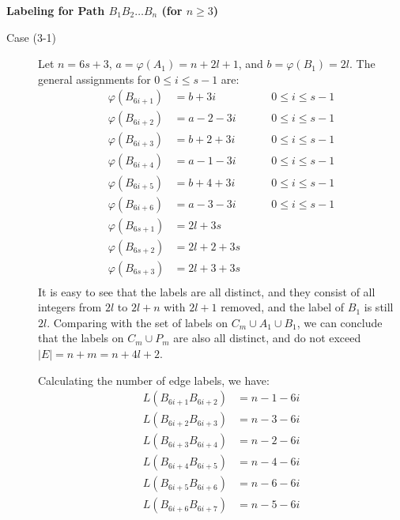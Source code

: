 \documentclass[fleqn,svgnames,screen,acmsmall]{ml2rcn}
\begin{document}
\textbf{Labeling for Path \(B_{1}B_{2} \ldots B_{n}\) (for \(n \ge 3\))}

\begin{description}
  
\item[Case (3-1)] Let \(n=6s+3\),  \(a = \varphi(A_{1}) = n+2l+1\), and \(b = \varphi(B_{1}) = 2l\). The general assignments for \(0 \le i \le s-1\) are:
\begin{equation}
\label{eq:case31}
  \begin{aligned}
  \varphi(B_{6i+1}) &= b+3i   & \quad \quad 0 \leq i \leq s-1\\
  \varphi(B_{6i+2}) &= a-2-3i & \quad \quad 0 \leq i \leq s-1\\
  \varphi(B_{6i+3}) &= b+2+3i & \quad \quad 0 \leq i \leq s-1\\
  \varphi(B_{6i+4}) &= a-1-3i & \quad \quad 0 \leq i \leq s-1\\
  \varphi(B_{6i+5}) &= b+4+3i & \quad \quad 0 \leq i \leq s-1\\
  \varphi(B_{6i+6}) &= a-3-3i & \quad \quad 0 \leq i \leq s-1\\
  \varphi(B_{6s+1}) &= 2l+3s \\
  \varphi(B_{6s+2}) &= 2l+2+3s \\
  \varphi(B_{6s+3}) &= 2l+3+3s \\
  \end{aligned}
\end{equation}
It is easy to see that the labels are all distinct, and they consist of all integers from $2l$ to $2l+n$ with 
$2l+1$ removed, and the label of $B_1$ is still $2l$. Comparing with the set of labels on $C_m \cup A_1 \cup B_1$, we can conclude that the labels on $C_m \cup P_m$  are also all distinct, and do not exceed $|E|=n+m=n+4l+2$.
 
Calculating the number of edge labels, we have:
\begin{equation}
\label{eq:case31edges}  
\begin{aligned}
L(B_{6i+1}B_{6i+2}) &= n-1-6i \\
L(B_{6i+2}B_{6i+3}) &= n-3-6i \\
L(B_{6i+3}B_{6i+4}) &= n-2-6i \\
L(B_{6i+4}B_{6i+5}) &= n-4-6i \\
L(B_{6i+5}B_{6i+6}) &= n-6-6i \\
L(B_{6i+6}B_{6i+7}) &= n-5-6i
\end{aligned}
\end{equation}


\end{description}
\end{document}
